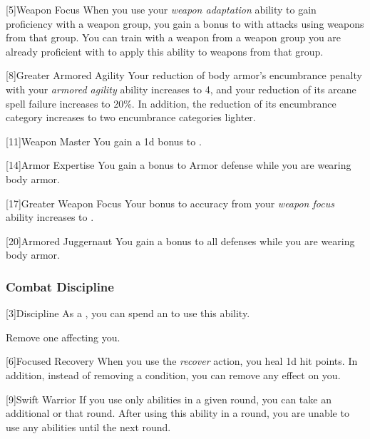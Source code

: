            [5]{Weapon Focus} 
            When you use your \textit{weapon adaptation} ability to gain proficiency with a weapon group, you gain a  bonus to  with attacks using weapons from that group.
            You can train with a weapon from a weapon group you are already proficient with to apply this ability to weapons from that group.

            [8]{Greater Armored Agility}
            Your reduction of body armor's encumbrance penalty with your \textit{armored agility} ability increases to 4, and your reduction of its arcane spell failure increases to 20\%.
            In addition, the reduction of its encumbrance category increases to two encumbrance categories lighter.

            [11]{Weapon Master} 
            You gain a \plus1d bonus to .

            [14]{Armor Expertise}
            You gain a  bonus to Armor defense while you are wearing body armor.

            [17]{Greater Weapon Focus} 
            Your bonus to accuracy from your \textit{weapon focus} ability increases to .

            [20]{Armored Juggernaut}
            You gain a  bonus to all defenses while you are wearing body armor.

        \subsubsection{Combat Discipline}

            [3]{Discipline} As a , you can spend an  to use this ability.
            \begin{ability}
                \begin{spelleffects}
                    \spelleffect Remove one  affecting you.
                \end{spelleffects}
            \end{ability}

            [6]{Focused Recovery}
            When you use the \textit{recover} action, you heal \plus1d hit points.
            In addition, instead of removing a condition, you can remove any  effect on you.

            [9]{Swift Warrior}
            If you use only  abilities in a given round, you can take an additional  or  that round.
            After using this ability in a round, you are unable to use any  abilities until the next round.

